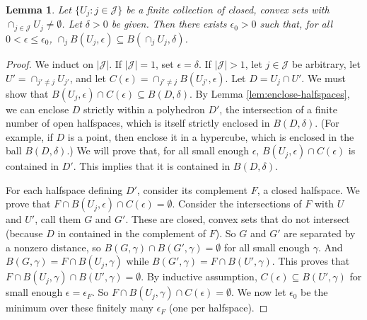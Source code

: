 \documentclass[11pt]{article}
\newtheorem{lemma}{Lemma}
\begin{document}
\begin{lemma} \label{lem:thick-nonempty}
  Let $\{U_j : j \in \mathcal{J}\}$ be a finite collection of closed, convex sets with $\cap_{j\in\mathcal{J}} U_j \neq \emptyset$.
  Let $\delta > 0$ be given.
  Then there exists  $\epsilon_0 > 0$ such that, for all $0 < \epsilon \leq \epsilon_0$, $\cap_j B(U_j,\epsilon) \subseteq B(\cap_j U_j, \delta)$.
\end{lemma}
\begin{proof}
  We induct on $|\mathcal{J}|$.
  If $|\mathcal{J}|=1$, set $\epsilon = \delta$.
  If $|\mathcal{J}|>1$, let $j\in\mathcal{J}$ be arbitrary, let $U' = \cap_{j'\neq j} U_{j'}$, and let $C(\epsilon) = \cap_{j' \neq j} B(U_{j'},\epsilon)$.
  Let $D = U_j \cap U'$.
  We must show that $B(U_j,\epsilon) \cap C(\epsilon) \subseteq B(D,\delta)$.
  By Lemma \ref{lem:enclose-halfspaces}, we can enclose $D$ strictly within a polyhedron $D'$, the intersection of a finite number of open halfspaces, which is itself strictly enclosed in $B(D,\delta)$.
  (For example, if $D$ is a point, then enclose it in a hypercube, which is enclosed in the ball $B(D,\delta)$.)
  We will prove that, for all small enough $\epsilon$, $B(U_j,\epsilon) \cap C(\epsilon)$ is contained in $D'$.
  This implies that it is contained in $B(D,\delta)$.

  For each halfspace defining $D'$, consider its complement $F$, a closed halfspace.
  We prove that $F \cap B(U_j,\epsilon) \cap C(\epsilon) = \emptyset$.
  Consider the intersections of $F$ with $U$ and $U'$, call them $G$ and $G'$.
  These are closed, convex sets that do not intersect (because $D$ in contained in the complement of $F$).
  So $G$ and $G'$ are separated by a nonzero distance, so $B(G,\gamma) \cap B(G',\gamma) = \emptyset$ for all small enough $\gamma$.
  And $B(G,\gamma) = F \cap B(U_j,\gamma)$ while $B(G',\gamma) = F \cap B(U',\gamma)$.
  This proves that $F \cap B(U_j,\gamma) \cap B(U',\gamma) = \emptyset$.
  By inductive assumption, $C(\epsilon) \subseteq B(U',\gamma)$ for small enough $\epsilon = \epsilon_F$.
  So $F \cap B(U_j,\gamma) \cap C(\epsilon) = \emptyset$.
  We now let $\epsilon_0$ be the minimum over these finitely many $\epsilon_F$ (one per halfspace).
\end{proof}
\end{document}
